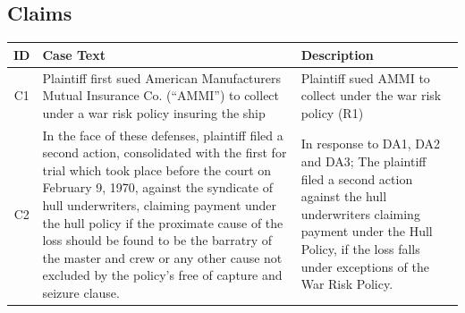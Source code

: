 


\newcommand{\claimOne}{Plaintiff first sued American Manufacturers Mutual Insurance Co. (“AMMI”) to collect under a war risk policy insuring the ship}
\newcommand{\claimOneDefinition}{Plaintiff sued AMMI to collect under the war risk policy (R1)}

\newcommand{\claimTwo}{In the face of these defenses, plaintiff filed a second action, consolidated with the first for trial which took place before the court on February 9, 1970, against the syndicate of hull underwriters, claiming payment under the hull policy if the proximate cause of the loss should be found to be the barratry of the master and crew or any other cause not excluded by the policy’s free of capture and seizure clause.}
\newcommand{\claimTwoDefinition}{In response to DA1, DA2 and DA3; The plaintiff filed a second action against the hull underwriters claiming payment under the Hull Policy, if the loss falls under exceptions of the War Risk Policy.}

\newpage
\subsection{Claims}
    \begin{center}
        \begin{tabular}{ | c | m{8cm} | m{5cm} | } 
            \hline
                ID & Case Text & Description \\ 
            \hline 
            \hline 
                C1 & \claimOne & \claimOneDefinition \\ 
            \hline 
                C2 & \claimTwo &  \claimTwoDefinition\\ 
            \hline 
        \end{tabular}
    \end{center}


